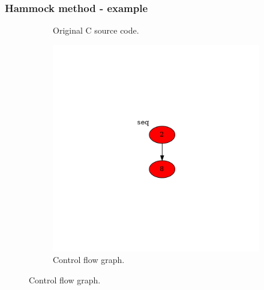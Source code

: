 \documentclass[aspectratio=1610]{beamer}
\begin{document}
\begin{frame}
	\frametitle{Hammock method - example}
	\begin{figure}[htbp]
		\centering
		\begin{subfigure}[b]{0.30\textwidth}
			\centering
			
			\caption{Original C source code.}
		\end{subfigure}
		\begin{subfigure}[b]{0.50\textwidth}
			\centering
			\includegraphics[height=0.6\paperheight]{inc/methods/hammock/example/without-break/main_0004a.png}
			\caption{Control flow graph.}
		\end{subfigure}
	\end{figure}
\end{frame}
\end{document}
